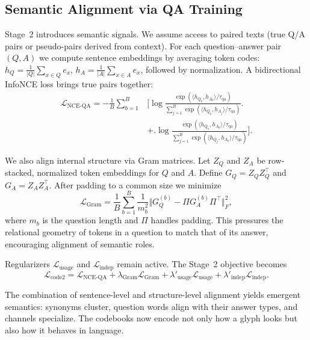 \documentclass[10pt,twocolumn]{article}
\begin{document}
\subsection{Semantic Alignment via QA Training}\label{sec:qa}
Stage~2 introduces semantic signals. We assume access to paired texts (true Q/A pairs or pseudo-pairs derived from context). For each question--answer pair $(Q, A)$ we compute sentence embeddings by averaging token codes: $h_Q = \frac{1}{|Q|}\sum_{x \in Q} e_x$, $h_A = \frac{1}{|A|}\sum_{x \in A} e_x$, followed by normalization. A bidirectional InfoNCE loss brings true pairs together:
\begin{equation}
\begin{aligned}
    \mathcal{L}_{\text{NCE-QA}} = -\frac{1}{B}\sum_{b=1}^B &\Big[ \log \frac{\exp(\langle h_{Q_b}, h_{A_b}\rangle / \tau_{\text{qa}})}{\sum_{j=1}^B \exp(\langle h_{Q_b}, h_{A_j}\rangle / \tau_{\text{qa}})} \Big. \\
    &+ \Big. \log \frac{\exp(\langle h_{Q_b}, h_{A_b}\rangle / \tau_{\text{qa}})}{\sum_{j=1}^B \exp(\langle h_{Q_j}, h_{A_b}\rangle / \tau_{\text{qa}})} \Big].
\end{aligned}
\end{equation}

We also align internal structure via Gram matrices. Let $Z_Q$ and $Z_A$ be row-stacked, normalized token embeddings for $Q$ and $A$. Define $G_Q = Z_Q Z_Q^\top$ and $G_A = Z_A Z_A^\top$. After padding to a common size we minimize
\begin{equation}
    \mathcal{L}_{\text{Gram}} = \frac{1}{B}\sum_{b=1}^B \frac{1}{m_b^2} \Vert G_Q^{(b)} - \Pi G_A^{(b)} \Pi^\top \Vert_F^2,
\end{equation}
where $m_b$ is the question length and $\Pi$ handles padding. This pressures the relational geometry of tokens in a question to match that of its answer, encouraging alignment of semantic roles.

Regularizers $\mathcal{L}_{\text{usage}}$ and $\mathcal{L}_{\text{indep}}$ remain active. The Stage~2 objective becomes
\begin{equation}
    \mathcal{L}_{\text{code2}} = \mathcal{L}_{\text{NCE-QA}} + \lambda_{\text{Gram}} \mathcal{L}_{\text{Gram}} + \lambda'_{\text{usage}} \mathcal{L}_{\text{usage}} + \lambda'_{\text{indep}} \mathcal{L}_{\text{indep}}.
\end{equation}

The combination of sentence-level and structure-level alignment yields emergent semantics: synonyms cluster, question words align with their answer types, and channels specialize. The codebooks now encode not only how a glyph looks but also how it behaves in language.
\end{document}
